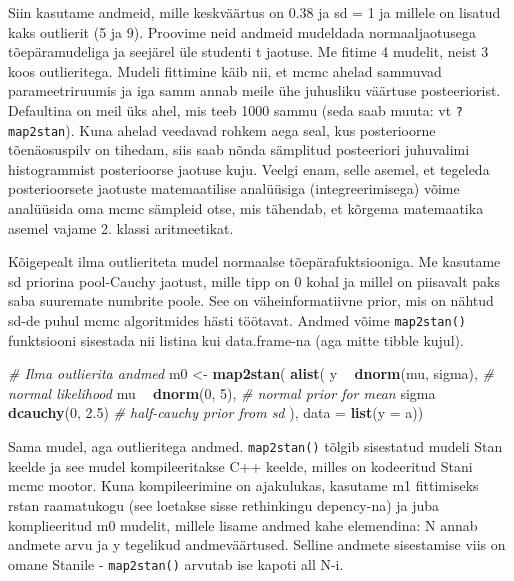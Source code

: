 \documentclass[]{book}
\newenvironment{Shaded}{\begin{snugshade}}{\end{snugshade}}
\newcommand{\KeywordTok}[1]{\textcolor[rgb]{0.13,0.29,0.53}{\textbf{#1}}}
\newcommand{\DataTypeTok}[1]{\textcolor[rgb]{0.13,0.29,0.53}{#1}}
\newcommand{\DecValTok}[1]{\textcolor[rgb]{0.00,0.00,0.81}{#1}}
\newcommand{\FloatTok}[1]{\textcolor[rgb]{0.00,0.00,0.81}{#1}}
\newcommand{\StringTok}[1]{\textcolor[rgb]{0.31,0.60,0.02}{#1}}
\newcommand{\CommentTok}[1]{\textcolor[rgb]{0.56,0.35,0.01}{\textit{#1}}}
\newcommand{\OperatorTok}[1]{\textcolor[rgb]{0.81,0.36,0.00}{\textbf{#1}}}
\newcommand{\NormalTok}[1]{#1}
\begin{document}
Siin kasutame andmeid, mille keskväärtus on 0.38 ja sd = 1 ja millele on
lisatud kaks outlierit (5 ja 9). Proovime neid andmeid mudeldada
normaaljaotusega tõepäramudeliga ja seejärel üle studenti t jaotuse. Me
fitime 4 mudelit, neist 3 koos outlieritega. Mudeli fittimine käib nii,
et mcmc ahelad sammuvad parameetriruumis ja iga samm annab meile ühe
juhusliku väärtuse posteeriorist. Defaultina on meil üks ahel, mis teeb
1000 sammu (seda saab muuta: vt \texttt{?map2stan}). Kuna ahelad
veedavad rohkem aega seal, kus posterioorne tõenäosuspilv on tihedam,
siis saab nõnda sämplitud posteeriori juhuvalimi histogrammist
posterioorse jaotuse kuju. Veelgi enam, selle asemel, et tegeleda
posterioorsete jaotuste matemaatilise analüüsiga (integreerimisega)
võime analüüsida oma mcmc sämpleid otse, mis tähendab, et kõrgema
matemaatika asemel vajame 2. klassi aritmeetikat.

Kõigepealt ilma outlieriteta mudel normaalse tõepärafuktsiooniga. Me
kasutame sd priorina pool-Cauchy jaotust, mille tipp on 0 kohal ja
millel on piisavalt paks saba suuremate numbrite poole. See on
väheinformatiivne prior, mis on nähtud sd-de puhul mcmc algoritmides
hästi töötavat. Andmed võime \texttt{map2stan()} funktsiooni sisestada
nii listina kui data.frame-na (aga mitte tibble kujul).

\begin{Shaded}
\begin{Highlighting}[]
\CommentTok{# Ilma outlierita andmed}
\NormalTok{m0 <-}\StringTok{ }\KeywordTok{map2stan}\NormalTok{(}
  \KeywordTok{alist}\NormalTok{(}
\NormalTok{    y }\OperatorTok{~}\StringTok{ }\KeywordTok{dnorm}\NormalTok{(mu, sigma),  }\CommentTok{# normal likelihood}
\NormalTok{    mu }\OperatorTok{~}\StringTok{ }\KeywordTok{dnorm}\NormalTok{(}\DecValTok{0}\NormalTok{, }\DecValTok{5}\NormalTok{), }\CommentTok{# normal prior for mean}
\NormalTok{    sigma }\OperatorTok{~}\StringTok{ }\KeywordTok{dcauchy}\NormalTok{(}\DecValTok{0}\NormalTok{, }\FloatTok{2.5}\NormalTok{) }\CommentTok{# half-cauchy prior from sd }
\NormalTok{  ),}
  \DataTypeTok{data =} \KeywordTok{list}\NormalTok{(}\DataTypeTok{y =}\NormalTok{ a))}
\end{Highlighting}
\end{Shaded}

Sama mudel, aga outlieritega andmed. \texttt{map2stan()} tõlgib
sisestatud mudeli Stan keelde ja see mudel kompileeritakse C++ keelde,
milles on kodeeritud Stani mcmc mootor. Kuna kompileerimine on
ajakulukas, kasutame m1 fittimiseks rstan raamatukogu (see loetakse
sisse rethinkingu depency-na) ja juba komplieeritud m0 mudelit, millele
lisame andmed kahe elemendina: N annab andmete arvu ja y tegelikud
andmeväärtused. Selline andmete sisestamise viis on omane Stanile -
\texttt{map2stan()} arvutab ise kapoti all N-i.
\end{document}
